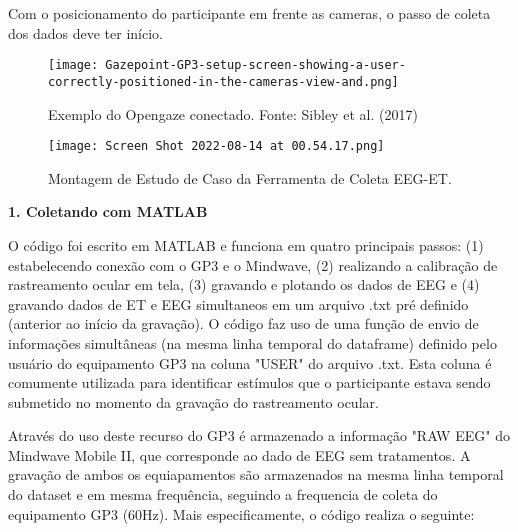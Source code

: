 Com o posicionamento do participante em frente as cameras, o passo de coleta dos dados deve ter início. 

\begin{figure}[!h]
    \texttt{[image: Gazepoint-GP3-setup-screen-showing-a-user-correctly-positioned-in-the-cameras-view-and.png]}
    \caption{Exemplo do Opengaze conectado. Fonte: Sibley et al. (2017)}
\end{figure}



\begin{figure}
    \centering
    \texttt{[image: Screen Shot 2022-08-14 at 00.54.17.png]}
    \caption{Montagem de Estudo de Caso da Ferramenta de Coleta EEG-ET.}
\end{figure}







\textbf{1. Coletando com MATLAB}

O código foi escrito em MATLAB e funciona em quatro principais passos: 
(1) estabelecendo conexão com o GP3 e o Mindwave, (2) realizando a calibração de rastreamento ocular em tela, 
(3) gravando e plotando os dados de EEG e (4) gravando dados de ET e EEG simultaneos em um arquivo .txt pré definido (anterior ao início da gravação). 
O código faz uso de uma função de envio de informações simultâneas (na mesma linha temporal do dataframe) definido pelo usuário 
do equipamento GP3 na coluna "USER" do arquivo .txt. Esta coluna é comumente utilizada para identificar estímulos que o participante 
estava sendo submetido no momento da gravação do rastreamento ocular. 

Através do uso deste recurso do GP3 é armazenado a informação "RAW EEG" do Mindwave Mobile II, que corresponde ao dado de EEG sem tratamentos. 
A gravação de ambos os equiapamentos são armazenados na mesma linha temporal do dataset e em mesma frequência, seguindo a
 frequencia de coleta do equipamento GP3 (60Hz). Mais especificamente, o código realiza o seguinte: 

